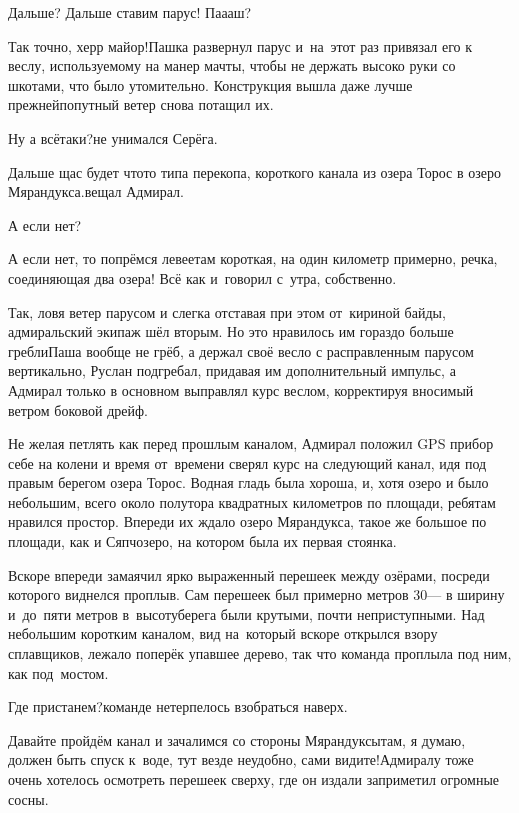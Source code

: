 \diagdash Дальше? Дальше ставим парус! П\sdash а\sdash а\sdash аш?

\diagdash Так точно, херр майор!\mdash Пашка развернул парус и~на~этот раз привязал его к веслу, используемому на манер мачты, чтобы не держать высоко руки со шкотами, что было утомительно. Конструкция вышла даже лучше прежней\mdash попутный ветер снова потащил их. 

\diagdash Ну а всё\sdash таки?\mdash не унимался Серёга.

\diagdash Дальше щас будет что\sdash то типа перекопа, короткого канала из озера Торос в озеро Мярандукса.\mdash вещал Адмирал.

\diagdash А если нет?

\diagdash А если нет, то попрёмся левее\mdash там короткая, на один километр примерно, речка, соединяющая два озера! Всё как и~говорил с~утра, собственно.

Так, ловя ветер парусом и слегка отставая при этом от~кириной байды, адмиральский экипаж шёл вторым. Но это нравилось им гораздо больше гребли\mdash Паша вообще не грёб, а держал своё весло с расправленным парусом вертикально, Руслан подгребал, придавая им дополнительный импульс, а Адмирал только в основном выправлял курс веслом, корректируя вносимый ветром боковой дрейф.

Не желая петлять как перед прошлым каналом, Адмирал положил GPS прибор себе на колени и время от~времени сверял курс на следующий канал, идя под правым берегом озера Торос. Водная гладь была хороша, и, хотя озеро и было небольшим, всего около полутора квадратных километров по площади, ребятам нравился простор. Впереди их ждало озеро Мярандукса, такое же большое по площади, как и Сяпчозеро, на котором была их первая стоянка. 

Вскоре впереди замаячил ярко выраженный перешеек между озёрами, посреди которого виднелся проплыв. Сам перешеек был примерно метров 30\thinspace\nobreakdash--- в ширину и~до~пяти метров в~высоту\mdash берега были крутыми, почти неприступными. Над небольшим коротким каналом, вид на~который вскоре открылся взору сплавщиков, лежало поперёк упавшее дерево, так что команда проплыла под ним, как под~мостом.

\diagdash Где пристанем?\mdash команде нетерпелось взобраться наверх.

\diagdash Давайте пройдём канал и зачалимся со стороны Мярандуксы\mdash там, я думаю, должен быть спуск к~воде, тут везде неудобно, сами видите!\mdash Адмиралу тоже очень хотелось осмотреть перешеек сверху, где он издали заприметил огромные сосны.

